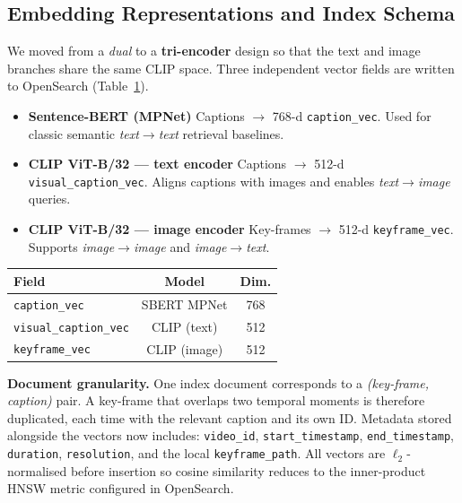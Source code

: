 \documentclass[runningheads]{llncs}
\begin{document}
\subsection{Embedding Representations and Index Schema}
We moved from a \emph{dual} to a \textbf{tri-encoder} design so that the text and image
branches share the same CLIP space.  
Three independent vector fields are written to OpenSearch (Table~\ref{tab:fields}).

\begin{itemize}
  \item \textbf{Sentence-BERT (MPNet)}  
        Captions $\rightarrow$ 768-d \texttt{caption\_vec}.  
        Used for classic semantic \emph{text$\!\to$text} retrieval baselines.
  \item \textbf{CLIP ViT-B/32 — text encoder}  
        Captions $\rightarrow$ 512-d \texttt{visual\_caption\_vec}.  
        Aligns captions with images and enables \emph{text$\!\to$image} queries.
  \item \textbf{CLIP ViT-B/32 — image encoder}  
        Key-frames $\rightarrow$ 512-d \texttt{keyframe\_vec}.  
        Supports \emph{image$\!\to$image} and \emph{image$\!\to$text}.
\end{itemize}

\begin{table}[h]
\centering
\begin{tabular}{lcc}
\toprule
Field & Model & Dim. \\ \midrule
\texttt{caption\_vec} & SBERT MPNet & 768 \\
\texttt{visual\_caption\_vec} & CLIP (text) & 512 \\
\texttt{keyframe\_vec} & CLIP (image) & 512 \\ \bottomrule
\end{tabular}\label{tab:fields}
\end{table}

\begin{sloppypar}
\textbf{Document granularity.}  
One index document corresponds to a \emph{(key-frame, caption)} pair.  
A key-frame that overlaps two temporal moments is therefore duplicated, each time
with the relevant caption and its own ID.  
Metadata stored alongside the vectors now includes:  
\texttt{video\_id}, \texttt{start\_timestamp}, \texttt{end\_timestamp},
\texttt{duration}, \texttt{resolution}, and the local \texttt{keyframe\_path}.
All vectors are $\ell_2$-normalised before insertion so cosine similarity reduces
to the inner-product HNSW metric configured in OpenSearch.
\end{sloppypar}
\end{document}
